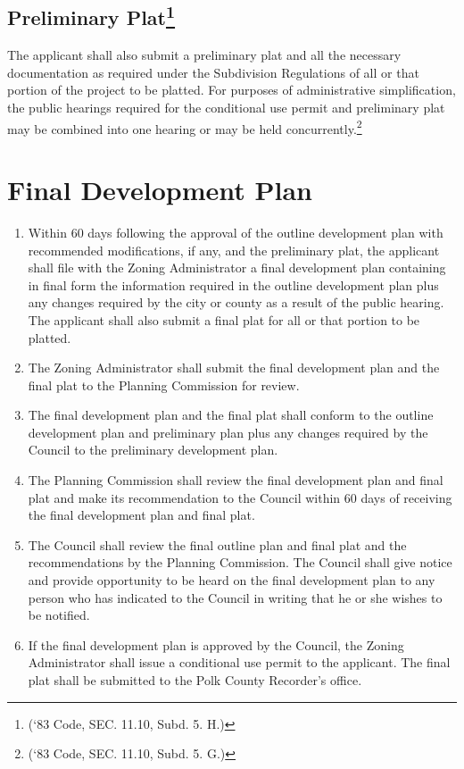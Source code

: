 \subsection{Preliminary Plat\footnote{(‘83 Code, SEC. 11.10, Subd. 5. H.)}}
The applicant shall also submit a preliminary plat and all the necessary documentation as required under the Subdivision Regulations of all or that portion of the project to be platted.  For purposes of administrative simplification, the public hearings required for the conditional use permit and preliminary plat may be combined into one hearing or may be held concurrently.\footnote{(‘83 Code, SEC. 11.10, Subd. 5. G.)}

\section{Final Development Plan}
\begin{enumerate}[{\indent}A)]
    \item Within 60 days following the approval of the outline development plan with recommended modifications, if any, and the preliminary plat, the applicant shall file with the Zoning Administrator a final development plan containing in final form the information required in the outline development plan plus any changes required by the city or county as a result of the public hearing. The applicant shall also submit a final plat for all or that portion to be platted.
    \item The Zoning Administrator shall submit the final development plan and the final plat to the Planning Commission for review.
    \item The final development plan and the final plat shall conform to the outline development plan and preliminary plan plus any changes required by the Council to the preliminary development plan.
    \item The Planning Commission shall review the final development plan and final plat and make its recommendation to the Council within 60 days of receiving the final development plan and final plat.
    \item The Council shall review the final outline plan and final plat and the recommendations by the Planning Commission. The Council shall give notice and provide opportunity to be heard on the final development plan to any person who has indicated to the Council in writing that he or she wishes to be notified.
    \item If the final development plan is approved by the Council, the Zoning Administrator shall issue a conditional use permit to the applicant. The final plat shall be submitted to the Polk County Recorder’s office.
\end{enumerate}


